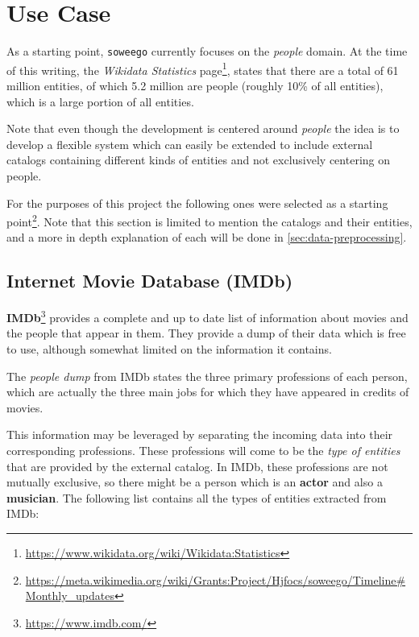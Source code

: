 \documentclass[epsfig,a4paper,11pt,titlepage,twoside,openany]{book}
\newcommand{\footurl}[1]{\footnote{\url{#1}}}
\begin{document}
\section{Use Case}
\label{sec:statement-use-case}

As a starting point, \texttt{soweego} currently focuses on the \textit{people} domain. At the time of this writing, the \textit{Wikidata Statistics} page\footurl{https://www.wikidata.org/wiki/Wikidata:Statistics}, states that there are a total of 61 million entities, of which 5.2 million are people (roughly 10\% of all entities), which is a large portion of all entities. 

Note that even though the development is centered around \textit{people} the idea is to develop a flexible system which can easily be extended to include external catalogs containing different kinds of entities and not exclusively centering on people. 

For the purposes of this project the following ones were selected as a starting point\footurl{https://meta.wikimedia.org/wiki/Grants:Project/Hjfocs/soweego/Timeline\#Monthly\_updates}. Note that this section is limited to mention the catalogs and their entities, and a more in depth explanation of each will be done in \autoref{sec:data-preprocessing}. 



\subsection{Internet Movie Database (IMDb)}
\label{sec:catalog-imdb}

\textbf{IMDb}\footurl{https://www.imdb.com/} provides a complete and up to date list of information about movies and the people that appear in them. They provide a dump of their data which is free to use, although somewhat limited on the information it contains.

The \textit{people dump} from IMDb states the three primary professions of each person, which are actually the three main jobs for which they have appeared in credits of movies. 


This information may be leveraged by separating the incoming data into their corresponding professions. These professions will come to be the \textit{type of entities} that are provided by the external catalog. In IMDb, these professions are not mutually exclusive, so there might be a person which is an \textbf{actor} and also a \textbf{musician}. The following list contains all the types of entities extracted from IMDb: 
\end{document}
